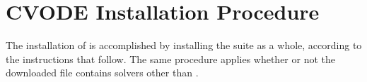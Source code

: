 \chapter{CVODE Installation Procedure}\label{s:install}

The installation of {\cvode} is accomplished by installing the
{\sundials} suite as a whole, according to the instructions that
follow.   The same procedure applies whether or not the downloaded
file contains solvers other than {\cvode}.

